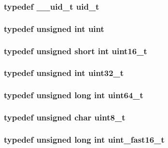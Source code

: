 \subsubsection[{uid\_\-t}]{\setlength{\rightskip}{0pt plus 5cm}typedef {\bf \_\-\_\-uid\_\-t} {\bf uid\_\-t}}\label{tp_8c_a1844226d778badcda0a21b28310830ea}
\subsubsection[{uint}]{\setlength{\rightskip}{0pt plus 5cm}typedef unsigned int {\bf uint}}\label{tp_8c_a91ad9478d81a7aaf2593e8d9c3d06a14}
\subsubsection[{uint16\_\-t}]{\setlength{\rightskip}{0pt plus 5cm}typedef unsigned short int {\bf uint16\_\-t}}\label{tp_8c_adf4d876453337156dde61095e1f20223}
\subsubsection[{uint32\_\-t}]{\setlength{\rightskip}{0pt plus 5cm}typedef unsigned int {\bf uint32\_\-t}}\label{tp_8c_a435d1572bf3f880d55459d9805097f62}
\subsubsection[{uint64\_\-t}]{\setlength{\rightskip}{0pt plus 5cm}typedef unsigned long int {\bf uint64\_\-t}}\label{tp_8c_a76708dd160ca0401c821b7b0124be563}
\subsubsection[{uint8\_\-t}]{\setlength{\rightskip}{0pt plus 5cm}typedef unsigned char {\bf uint8\_\-t}}\label{tp_8c_aba7bc1797add20fe3efdf37ced1182c5}
\subsubsection[{uint\_\-fast16\_\-t}]{\setlength{\rightskip}{0pt plus 5cm}typedef unsigned long int {\bf uint\_\-fast16\_\-t}}\label{tp_8c_a4b009f9587536282afc6d2fb4ee4c410}

